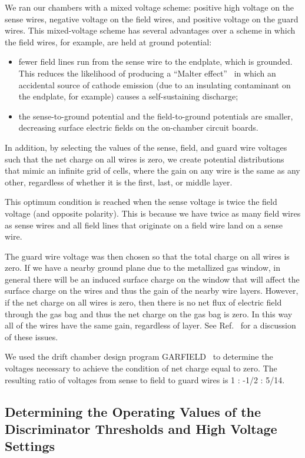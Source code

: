 We ran our chambers with a mixed voltage scheme:
positive high voltage on the sense wires, negative voltage on the
field wires, and positive voltage on the guard wires.
This mixed-voltage scheme has several advantages over a scheme in
which the field wires, for example, are held at ground potential:
\begin{itemize}
\item fewer field lines run from the sense wire to the endplate, which
is grounded.  This reduces the likelihood of producing a ``Malter effect''~\cite{malter} in
which an accidental source of cathode emission
(due to an insulating contaminant on the endplate, for example) causes
a self-sustaining discharge;
\item the sense-to-ground potential and the field-to-ground potentials 
are smaller, decreasing surface electric fields on the on-chamber
circuit boards.
\end{itemize}

In addition, by selecting the values of the sense, field, and
guard wire voltages such that the net charge on all wires is zero, 
we create potential distributions that mimic
an infinite grid of cells, where the gain on any wire is the same as
any other, regardless of whether it is the first, last, or middle layer.

This optimum condition is reached when the sense voltage is twice the
field voltage (and opposite polarity).  This is because we have twice as many
field wires as sense wires and all field lines that originate on a
field wire land on a sense wire.  

The guard wire voltage was then chosen so that the total charge on all wires is zero.  
If we have a nearby ground plane due to the metallized gas window, in general
there will be an induced surface charge on the window 
that will affect the surface charge on the wires and
thus the gain of the nearby wire layers.  However, if the net charge on
all wires is zero, then there is no net flux of electric field through the
gas bag and thus the net charge on the gas bag is zero.  In this way all
of the wires have the same gain, regardless of layer.  
See Ref.~\cite{mdm92} for a discussion of these issues.

We used the drift chamber design program GARFIELD~\cite{GARFIELD} to determine the voltages
necessary to achieve the condition of net charge equal to zero.
The resulting ratio of voltages from sense to field to guard wires is 1 : -1/2 : 5/14.

\subsection{Determining the Operating Values of the Discriminator Thresholds and High Voltage Settings}
\label{determine-operating-parameters}

